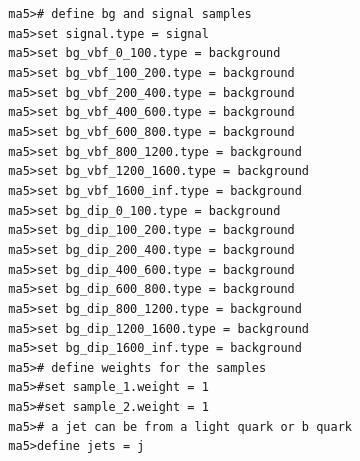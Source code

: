 \documentclass[a4paper, 10pt]{article}
\begin{document}
\texttt{ }\texttt{ }\texttt{ma5>\# define bg and signal samples\\
}
\texttt{ }\texttt{ }\texttt{ma5>set signal.type = signal\\
}
\texttt{ }\texttt{ }\texttt{ma5>set bg\_vbf\_0\_100.type = background\\
}
\texttt{ }\texttt{ }\texttt{ma5>set bg\_vbf\_100\_200.type = background\\
}
\texttt{ }\texttt{ }\texttt{ma5>set bg\_vbf\_200\_400.type  = background\\
}
\texttt{ }\texttt{ }\texttt{ma5>set bg\_vbf\_400\_600.type  = background\\
}
\texttt{ }\texttt{ }\texttt{ma5>set bg\_vbf\_600\_800.type  = background\\
}
\texttt{ }\texttt{ }\texttt{ma5>set bg\_vbf\_800\_1200.type  = background\\
}
\texttt{ }\texttt{ }\texttt{ma5>set bg\_vbf\_1200\_1600.type  = background\\
}
\texttt{ }\texttt{ }\texttt{ma5>set bg\_vbf\_1600\_inf.type = background\\
}
\texttt{ }\texttt{ }\texttt{ma5>set bg\_dip\_0\_100.type = background\\
}
\texttt{ }\texttt{ }\texttt{ma5>set bg\_dip\_100\_200.type = background\\
}
\texttt{ }\texttt{ }\texttt{ma5>set bg\_dip\_200\_400.type = background\\
}
\texttt{ }\texttt{ }\texttt{ma5>set bg\_dip\_400\_600.type = background\\
}
\texttt{ }\texttt{ }\texttt{ma5>set bg\_dip\_600\_800.type = background\\
}
\texttt{ }\texttt{ }\texttt{ma5>set bg\_dip\_800\_1200.type = background\\
}
\texttt{ }\texttt{ }\texttt{ma5>set bg\_dip\_1200\_1600.type = background\\
}
\texttt{ }\texttt{ }\texttt{ma5>set bg\_dip\_1600\_inf.type = background\\
}
\texttt{ }\texttt{ }\texttt{ma5>\# define weights for the samples\\
}
\texttt{ }\texttt{ }\texttt{ma5>\#set sample\_1.weight = 1\\
}
\texttt{ }\texttt{ }\texttt{ma5>\#set sample\_2.weight = 1\\
}
\texttt{ }\texttt{ }\texttt{ma5>\# a jet can be from a light quark or b quark\\
}
\texttt{ }\texttt{ }\texttt{ma5>define jets = j\\
}
\end{document}
